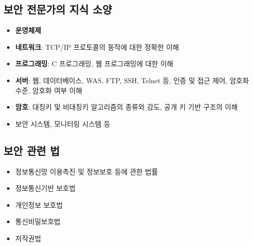 \subsection{보안 전문가의 지식 소양}
\begin{itemize}
	\item \textbf{운영체제}
	\item \textbf{네트워크}: TCP/IP 프로토콜의 동작에 대한 정확한 이해
	\item \textbf{프로그래밍}: C 프로그래밍, 웹 프로그래밍에 대한 이해
	\item \textbf{서버}: 웹, 데이터베이스, WAS, FTP, SSH, Telnet 등, 인증 및 접근 제어, 암호화 수준, 암호화 여부 이해
	\item \textbf{암호}: 대칭키 및 비대칭키 알고리즘의 종류와 강도, 공개 키 기반 구조의 이해
	\item 보안 시스템, 모니터링 시스템 등
\end{itemize}

\subsection{보안 관련 법}
\begin{itemize}
	\item 정보통신망 이용촉진 및 정보보호 등에 관한 법률
	\item 정보통신기반 보호법
	\item 개인정보 보호법
	\item 통신비밀보호법
	\item 저작권법
\end{itemize}